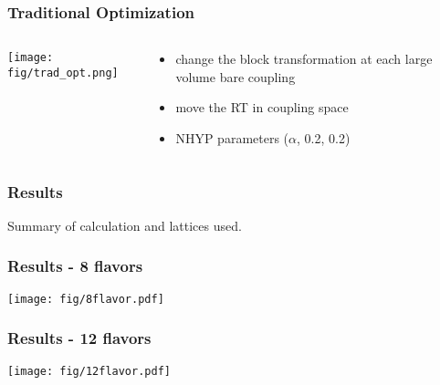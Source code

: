 \documentclass{beamer}
\begin{document}
  \begin{frame}
    \frametitle{Traditional Optimization}
    \begin{columns}[T]
      \begin{column}{.5\textwidth}
        \begin{block}{}
          \texttt{[image: fig/trad\_opt.png]}
        \end{block}
      \end{column}
      \begin{column}{.5\textwidth}
        \begin{block}{}
          \begin{itemize}
            \item change the block transformation at each large volume bare coupling
            \item move the RT in coupling space
            \item NHYP parameters ($\alpha$, 0.2, 0.2)
          \end{itemize}
        \end{block}
      \end{column}
    \end{columns}
  \end{frame}

  \begin{frame}
    \frametitle{Results}
    Summary of calculation and lattices used.
  \end{frame}

  \begin{frame}
    \frametitle{Results - 8 flavors}
    \centering
    \texttt{[image: fig/8flavor.pdf]}
  \end{frame}

  \begin{frame}
    \frametitle{Results - 12 flavors}
    \centering
    \texttt{[image: fig/12flavor.pdf]}
  \end{frame}
\end{document}
